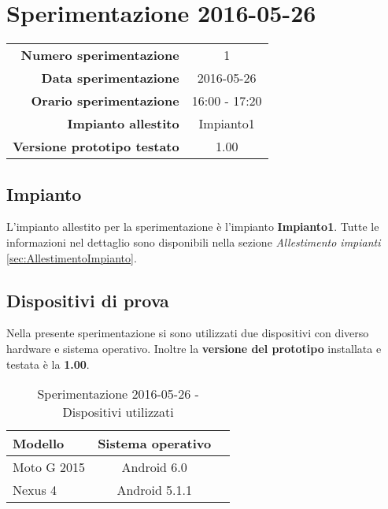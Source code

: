 \documentclass[../Sperimentazione.tex]{subfiles}
\begin{document}
	\section{Sperimentazione 2016-05-26}
	
		\begin{table} [h]
		\centering
		\begin{tabular}[width=0.5\textwidth]{r|c}
			\textbf{Numero sperimentazione} & 1 \\
			\textbf{Data sperimentazione} & 2016-05-26 \\
			\textbf{Orario sperimentazione} & 16:00 - 17:20 \\
			\textbf{Impianto allestito} & Impianto1 \\
			\textbf{Versione prototipo testato} & 1.00 \\		
		\end{tabular}
		\end{table}
		
		
		\subsection{Impianto}
		L'impianto allestito per la sperimentazione è l'impianto \textbf{Impianto1}. Tutte le informazioni nel dettaglio sono disponibili nella sezione \textit{Allestimento impianti} \ref{sec:AllestimentoImpianto}.


		\subsection{Dispositivi di prova}
			Nella presente sperimentazione si sono utilizzati due dispositivi con diverso hardware e sistema operativo. Inoltre la \textbf{versione del prototipo} installata e testata è la \textbf{1.00}.
	
			\begin{table} [h]
			\centering
				\begin{tabular}{lcc}
					\textbf{Modello} & \textbf{Sistema operativo} \\
					\toprule
					Moto G 2015 & Android 6.0 \\
					\midrule
					Nexus 4 & Android 5.1.1 \\
					\bottomrule
				\end{tabular}
				\caption{Sperimentazione 2016-05-26 - Dispositivi utilizzati}
				\label{tab:Sperimentazione1Dispositivi}
			\end{table}
		
\end{document}
